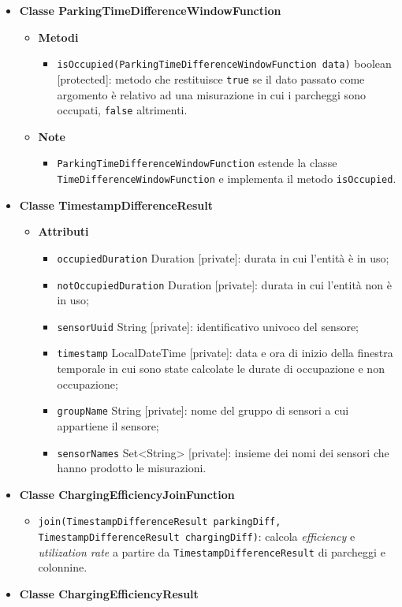 \begin{itemize}
	\item \textbf{Classe ParkingTimeDifferenceWindowFunction}
	      \begin{itemize}
		      \item \textbf{Metodi}
		            \begin{itemize}
			            \item \texttt{isOccupied(ParkingTimeDifferenceWindowFunction data)} boolean [protected]: metodo che restituisce \texttt{true} se il dato passato come argomento è relativo ad una misurazione in cui i
			                  parcheggi sono occupati, \texttt{false} altrimenti.
		            \end{itemize}
		      \item \textbf{Note}
		            \begin{itemize}
			            \item \texttt{ParkingTimeDifferenceWindowFunction} estende la classe \\\texttt{TimeDifferenceWindowFunction} e implementa il metodo \texttt{isOccupied}.
		            \end{itemize}
	      \end{itemize}
	\item \textbf{Classe TimestampDifferenceResult}
	      \begin{itemize}
		      \item \textbf{Attributi}
		            \begin{itemize}
			            \item \texttt{occupiedDuration} Duration [private]: durata in cui l'entità è in uso;
			            \item \texttt{notOccupiedDuration} Duration [private]: durata in cui l'entità non è in uso;
			            \item \texttt{sensorUuid} String [private]: identificativo univoco del sensore;
			            \item \texttt{timestamp} LocalDateTime [private]: data e ora di inizio della finestra temporale in cui sono state calcolate le durate di occupazione e non occupazione;
			            \item \texttt{groupName} String [private]: nome del gruppo di sensori a cui appartiene il sensore;
			            \item \texttt{sensorNames} Set<String> [private]: insieme dei nomi dei sensori che hanno prodotto le misurazioni.
		            \end{itemize}
	      \end{itemize}
	\item \textbf{Classe ChargingEfficiencyJoinFunction}
	      \begin{itemize}
		      \item \texttt{join(TimestampDifferenceResult parkingDiff, TimestampDifferenceResult chargingDiff)}: calcola \textit{efficiency} e \textit{utilization rate} a partire da \texttt{TimestampDifferenceResult}
		            di parcheggi e colonnine.
	      \end{itemize}
	\item \textbf{Classe ChargingEfficiencyResult}


\end{itemize}

